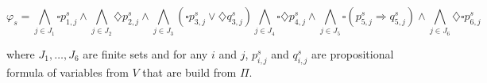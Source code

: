\documentclass[10pt,letterpaper]{article}
\begin{document}
\begin{equation*}
\varphi_{s} = \bigwedge\limits_{j \in J_{1}} \square p_{1,j}^{s} \land
\bigwedge\limits_{j \in J_{2}} \diamondsuit p_{2,j}^{s} \land
\bigwedge\limits_{j \in J_{3}} ( \square p_{3,j}^{s} \lor \diamondsuit q_{3,j}^{s})
\bigwedge\limits_{j \in J_{4}} \square\diamondsuit p_{4,j}^{s} \land
\bigwedge\limits_{j \in J_{5}} \square (p_{5,j}^{s} \Rightarrow q_{5,j}^{s}) \land 
\bigwedge\limits_{j \in J_{6}} \diamondsuit \square p_{6,j}^{s}
\end{equation*}

where $J_{1}, \ldots, J_{6}$ are finite sets and for any $i$ and $j$, $p_{i,j}^{s}$ and $q_{i,j}^{s}$ are propositional formula of variables from $V$ that are build from $\Pi$.


		
\end{document}
